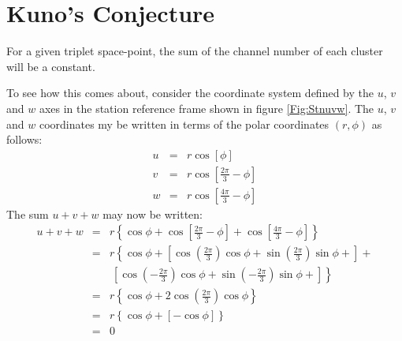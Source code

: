 \section{Kuno's Conjecture}
\label{App:SciFiKuno}

For a given triplet space-point, the sum of the channel number of each
cluster will be a constant. 

To see how this comes about, consider the coordinate system defined by
the $u$, $v$ and $w$ axes in the station reference frame shown in
figure \ref{Fig:Stnuvw}.
The $u$, $v$ and $w$ coordinates my be written in terms of the polar
coordinates $(r, \phi)$ as follows:
\begin{eqnarray}
  u & = & r \cos [ \phi ]                                       \\
  v & = & r \cos \left[ \frac{2\pi}{3}-\phi \right]             \\
  w & = & r \cos \left[ \frac{4\pi}{3}-\phi \right]
\end{eqnarray}
The sum $u+v+w$ may now be written: 
\begin{eqnarray}
  u + v + w & = & r \left\{
                      \cos \phi  + 
                      \cos \left[ \frac{2\pi}{3}-\phi \right] + 
                      \cos \left[ \frac{4\pi}{3}-\phi \right] 
                    \right\}                                     \\
            & = & r \left\{
                      \cos \phi + 
                      \left[ 
                        \cos \left( \frac{2 \pi}{3} \right) \cos \phi +
                        \sin \left( \frac{2 \pi}{3} \right) \sin \phi +
                      \right] +        \right.                   \\
            &  &  ~ \left. \left[ 
                        \cos \left(-\frac{2 \pi}{3} \right) \cos \phi +
                        \sin \left(-\frac{2 \pi}{3} \right) \sin \phi +
                      \right] 
                    \right\}                                    \\
            & = & r \left\{
                      \cos \phi + 
                      2 \cos \left( \frac{2 \pi}{3} \right) \cos \phi
                    \right\}                                     \\
            & = & r \left\{
                      \cos \phi +
                      \left[ - \cos \phi \right]
                    \right\}                                     \\
            & = & 0
\end{eqnarray}
